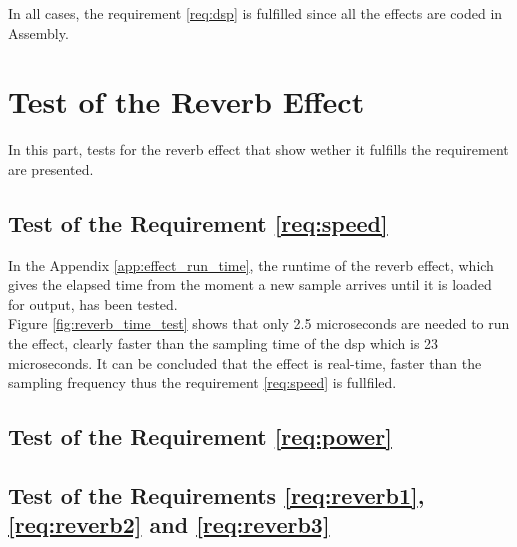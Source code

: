 In all cases, the requirement \ref{req:dsp} is fulfilled since all the effects are coded in Assembly.


\section{Test of the Reverb Effect}

In this part, tests for the reverb effect that show wether it fulfills the requirement are presented. 

\subsection{Test of the Requirement \ref{req:speed}}

In the Appendix \ref{app:effect_run_time}, the runtime of the reverb effect, which gives the elapsed time from the moment a new sample arrives until it is loaded for output, has been tested. \\
Figure \ref{fig:reverb_time_test} shows that only 2.5 microseconds are needed to run the effect, clearly faster than the sampling time of the \gls{dsp} which is 23 microseconds. It can be concluded that the effect is real-time, faster than the sampling frequency thus the requirement \ref{req:speed} is fullfiled. 

\subsection{Test of the Requirement \ref{req:power}}

\subsection{Test of the Requirements \ref{req:reverb1}, \ref{req:reverb2} and \ref{req:reverb3}}